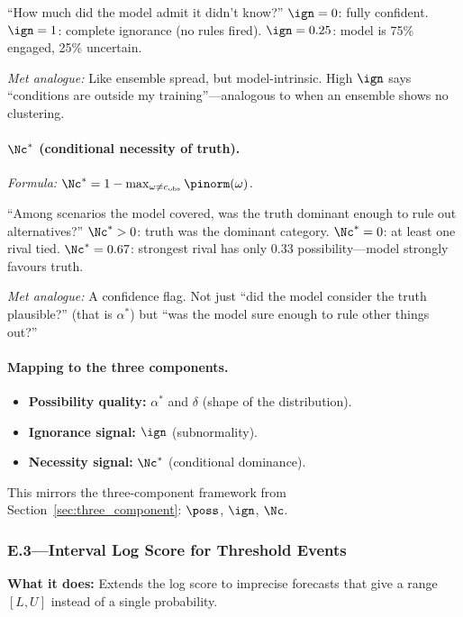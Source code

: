 ``How much did the model admit it didn't know?'' $\ign = 0$: fully confident. $\ign = 1$: complete ignorance (no rules fired). $\ign = 0.25$: model is 75\% engaged, 25\% uncertain.

\textit{Met analogue:} Like ensemble spread, but model-intrinsic. High $\ign$ says ``conditions are outside my training''---analogous to when an ensemble shows no clustering.

\paragraph{$\Nc^*$ (conditional necessity of truth).}
\textit{Formula:} $\Nc^* = 1 - \max_{\omega \neq c_{\mathrm{obs}}} \pinorm(\omega)$.

``Among scenarios the model covered, was the truth dominant enough to rule out alternatives?'' $\Nc^* > 0$: truth was the dominant category. $\Nc^* = 0$: at least one rival tied. $\Nc^* = 0.67$: strongest rival has only 0.33 possibility---model strongly favours truth.

\textit{Met analogue:} A confidence flag. Not just ``did the model consider the truth plausible?'' (that is $\alpha^*$) but ``was the model sure enough to rule other things out?''

\paragraph{Mapping to the three components.}
\begin{itemize}[leftmargin=2em]
\item \textbf{Possibility quality:} $\alpha^*$ and $\delta$ (shape of the distribution).
\item \textbf{Ignorance signal:} $\ign$ (subnormality).
\item \textbf{Necessity signal:} $\Nc^*$ (conditional dominance).
\end{itemize}

This mirrors the three-component framework from Section~\ref{sec:three_component}: $\poss$, $\ign$, $\Nc$.

\subsubsection{E.3---Interval Log Score for Threshold Events}\label{sec:plain_e3}

\textbf{What it does:} Extends the log score to imprecise forecasts that give a range $[L, U]$ instead of a single probability.

